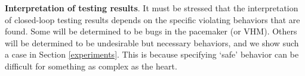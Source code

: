 
\textbf{Interpretation of testing results}.
It must be stressed that the interpretation of closed-loop testing results depends on the specific violating behaviors that are found.
Some will be determined to be bugs in the pacemaker (or VHM). 
Others will be determined to be undesirable but necessary behaviors, and we show such a case in Section \ref{experiments}.
This is because specifying `safe' behavior can be difficult for something as complex as the heart.
